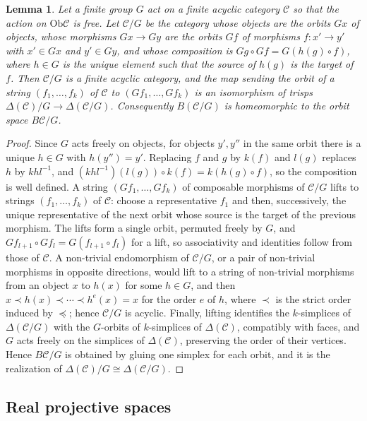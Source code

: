 \documentclass[12pt]{amsart}
\newtheorem{lemma}[teo]{Lemma}
\theoremstyle{definition}
\theoremstyle{remark}
\newcommand{\CC}{\mathcal{C}}
\newcommand{\co}{\colon}
\newcommand{\Ob}{\mathrm{Ob}}
\newcommand{\nerve}{\Delta}
\begin{document}
\begin{lemma}\label{lem:free-quotient}
Let a finite group $G$ act on a finite acyclic category $\CC$ so that the action on $\Ob\CC$ is free. Let $\CC/G$ be the category whose objects are the orbits $Gx$ of objects, whose morphisms $Gx\to Gy$ are the orbits $Gf$ of morphisms $f\co x'\to y'$ with $x'\in Gx$ and $y'\in Gy$, and whose composition is $Gg\circ Gf=G(h(g)\circ f)$, where $h\in G$ is the unique element such that the source of $h(g)$ is the target of $f$. Then $\CC/G$ is a finite acyclic category, and the map sending the orbit of a string $(f_1,\dots,f_k)$ of $\CC$ to $(Gf_1,\dots,Gf_k)$ is an isomorphism of trisps $\nerve(\CC)/G\to\nerve(\CC/G)$. Consequently $B(\CC/G)$ is homeomorphic to the orbit space $B\CC/G$.
\end{lemma}

\begin{proof}
Since $G$ acts freely on objects, for objects $y',y''$ in the same orbit there is a unique $h\in G$ with $h(y'')=y'$. Replacing $f$ and $g$ by $k(f)$ and $l(g)$ replaces $h$ by $khl^{-1}$, and $(khl^{-1})(l(g))\circ k(f)=k(h(g)\circ f)$, so the composition is well defined. A string $(Gf_1,\dots,Gf_k)$ of composable morphisms of $\CC/G$ lifts to strings $(f_1,\dots,f_k)$ of $\CC$: choose a representative $f_1$ and then, successively, the unique representative of the next orbit whose source is the target of the previous morphism. The lifts form a single orbit, permuted freely by $G$, and $Gf_{l+1}\circ Gf_l=G(f_{l+1}\circ f_l)$ for a lift, so associativity and identities follow from those of $\CC$. A non-trivial endomorphism of $\CC/G$, or a pair of non-trivial morphisms in opposite directions, would lift to a string of non-trivial morphisms from an object $x$ to $h(x)$ for some $h\in G$, and then $x\prec h(x)\prec\cdots\prec h^e(x)=x$ for the order $e$ of $h$, where $\prec$ is the strict order induced by $\preceq$; hence $\CC/G$ is acyclic. Finally, lifting identifies the $k$-simplices of $\nerve(\CC/G)$ with the $G$-orbits of $k$-simplices of $\nerve(\CC)$, compatibly with faces, and $G$ acts freely on the simplices of $\nerve(\CC)$, preserving the order of their vertices. Hence $B\CC/G$ is obtained by gluing one simplex for each orbit, and it is the realization of $\nerve(\CC)/G\cong\nerve(\CC/G)$.
\end{proof}

\subsection{Real projective spaces}\label{subsec:RPn}
\end{document}

